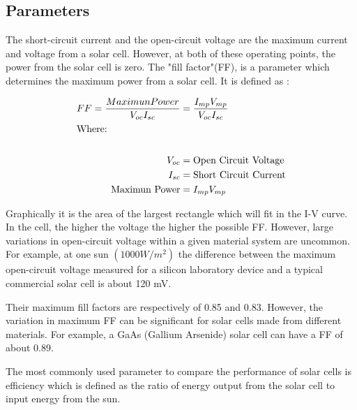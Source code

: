 \documentclass[11pt]{article} %
\begin{document}

\subsection{Parameters}

The short-circuit current and the open-circuit voltage are the maximum current and voltage from a solar cell. However, at both of these operating points, the power from the solar cell is zero. The "fill factor"(FF), is a parameter which determines the maximum power from a solar cell. It is defined as : 

\begin{align}
FF = \frac{MaximunPower}{V_{oc}I_{sc}}  &= \frac{I_{mp}V_{mp}}{V_{oc}I_{sc}} \\
\intertext{Where:} \\
V_{oc} &= \text{Open Circuit Voltage} \\
I_{sc} &= \text{Short Circuit Current} \\
\text{Maximun Power} &= I_{mp}V_{mp} \\
\end{align}

%


Graphically it is the area of the largest rectangle which will fit in the I-V curve. In the cell, the higher the voltage the higher the possible FF. However, large variations in open-circuit voltage within a given material system are uncommon. For example, at one sun $(1000 W/m^2)$ the difference between the maximum open-circuit voltage measured for a silicon laboratory device and a typical commercial solar cell is about 120 mV. 

Their maximum fill factors are respectively of 0.85 and 0.83. However, the variation in maximum FF can be significant for solar cells made from different materials. For example, a GaAs (Gallium Arsenide) solar cell can have a FF of about 0.89. 

The most commonly used parameter to compare the performance of solar cells is efficiency which is defined as the ratio of energy output from the solar cell to input energy from the sun. 
\end{document}
